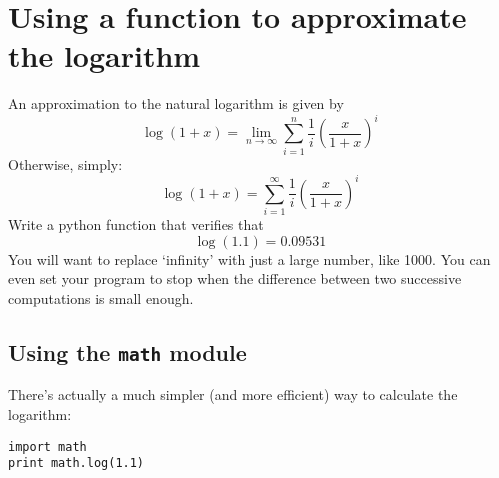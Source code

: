\documentclass{article}
\begin{document}
\section*{Using a function to approximate the logarithm}
An approximation to the natural logarithm is given by
\begin{equation}
\log(1 + x) = 
\lim_{n \rightarrow \infty}
\sum_{i=1}^n \frac{1}{i}\left(\frac{x}{1+x}\right)^{i}
\end{equation}
\newline
Otherwise, simply:
\begin{equation}
\log(1 + x) = 
\sum_{i=1}^{\infty} \frac{1}{i}\left(\frac{x}{1+x}\right)^{i}
\end{equation}
\newline
Write a python function that verifies that
\begin{equation}
\log(1.1) = 0.09531
\end{equation}
\newline
You will want to replace `infinity' with just a large number, like 1000. You can
even set your program to stop when the difference between two successive
computations is small enough.
\newline
\newline
\subsection*{Using the \texttt{math} module}
There's actually a much simpler (and more efficient) way to calculate the
logarithm:

\begin{verbatim}
import math
print math.log(1.1)
\end{verbatim}
\end{document}

